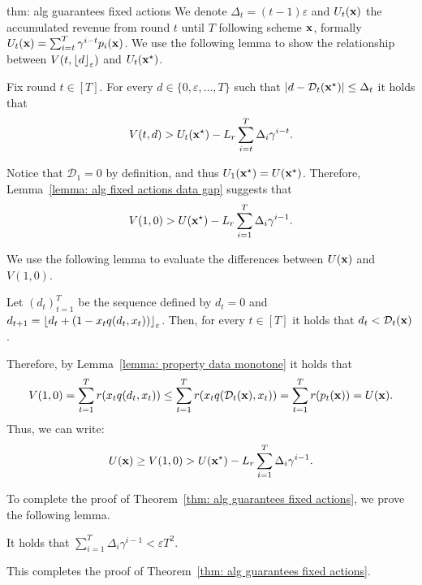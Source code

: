 \begin{proofof}{thm: alg guarantees fixed actions}
We denote $\Delta_t = (t-1)\varepsilon$ and $U_t({\bf{x}})$ the accumulated revenue from round $t$ until $T$ following scheme ${\bf{x}}$, formally $U_t({\bf{x}}) = \sum_{i = t}^T \gamma^{i-t} p_i({\bf{x}})$. We use the following lemma to show the relationship between $V(t, {\left\lfloor d\right\rfloor_{\varepsilon}})$ and $U_t({\bf{x}}^\star)$.

\begin{lemma}\label{lemma: alg fixed actions data gap}
Fix round $t \in [T]$. For every $d \in \{ 0, \varepsilon, \ldots, T \}$ such that $\left| d - \mathcal{D}_t({\bf{x}}^\star) \right| \leq \Delta_t$ it holds that
\[
V(t,d) > U_t({\bf{x}}^\star) - L_r \sum_{i = t}^T \Delta_i \gamma^{i-t}.
\]
\end{lemma}

Notice that $\mathcal{D}_1 = 0$ by definition, and thus $U_1({\bf{x}}^\star) = U({\bf{x}}^\star)$. Therefore, Lemma~\ref{lemma: alg fixed actions data gap} suggests that
\begin{align*}
V(1,0) > U({\bf{x}}^\star) - L_r \sum_{i = 1}^T \Delta_i \gamma^{i-1}.
\end{align*}

We use the following lemma to evaluate the differences between $U({\bf{x}})$ and $V(1,0)$.

\begin{lemma} \label{lemma: alg fixed action lower data}
Let $(d_t)_{t = 1}^T$ be the sequence defined by $d_t = 0$ and $d_{t+1} = 
{\left\lfloor d_t + (1-x_t q(d_t, x_t))\right\rfloor_{\varepsilon}}$. Then, for every $t \in [T]$ it holds that $d_t < \mathcal{D}_{t}({\bf{x}})$.
\end{lemma}

Therefore, by Lemma~\ref{lemma: property data monotone} it holds that
\begin{align*}
V(1,0) = \sum_{t = 1}^T r(x_t q(d_t, x_t)) \leq \sum_{t = 1}^T r(x_t q(\mathcal{D}_t({\bf{x}}), x_t)) = \sum_{t = 1}^T r(p_t({\bf{x}})) = U({\bf{x}}).
\end{align*}
Thus, we can write:
\begin{align*}
U({\bf{x}}) \geq V(1,0) > U({\bf{x}}^\star) - L_r \sum_{i = 1}^T \Delta_i \gamma^{i-1}.
\end{align*}

To complete the proof of Theorem~\ref{thm: alg guarantees fixed actions}, we prove the following lemma.
\begin{lemma} \label{lemma: alg fixed actions approximation}
It holds that $\sum_{i = 1}^T \Delta_i \gamma^{i-1} < \varepsilon T^2$.
\end{lemma}
This completes the proof of Theorem~\ref{thm: alg guarantees fixed actions}.
\end{proofof}




